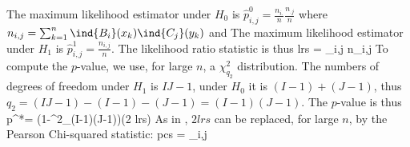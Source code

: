 The maximum likelihood estimator under $H_0$ is
$\hat{p}^0_{i,j}=\frac{n_{i.}}{n}\frac{n_{.j}}{n}$ where
$n_{i,j}=\sum_{k=1}^n \ind{B_i}(x_k) \ind{C_j}(y_k)$ and
 \be
 \ee
The maximum likelihood estimator under $H_1$ is
$\hat{p}^1_{i,j}=\frac{n_{i,j}}{n}$. The likelihood ratio
statistic is thus
 \be
 lrs = \sum_{i,j} n_{i,j} \ln {}
 \ee
To compute the $p$-value, we use, for large $n$, a
$\chi^2_{q_2}$ distribution. The numbers of degrees of freedom
under $H_1$ is $IJ-1$, under $H_0$ it is $(I-1)+(J-1)$, thus
$q_2=(IJ-1)-(I-1)-(J-1)=(I-1)(J-1)$. The $p$-value is thus
 \be p^*= \left(1-\chi^2_{(I-1)(J-1)}\right)(2 lrs)
 \ee
As in , $2 lrs$ can be replaced, for large $n$, by the Pearson
Chi-squared
statistic:
 \be
 pcs = \sum_{i,j} 
 \ee

